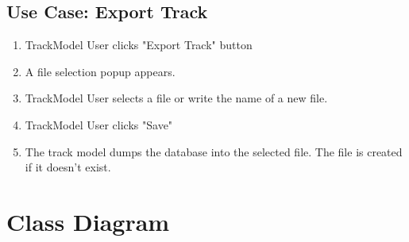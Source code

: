 \documentclass{scrreprt}
\begin{document}
\subsection{Use Case: Export Track}
\begin{enumerate}
	\item TrackModel User clicks "Export Track" button
	\item A file selection popup appears.
	\item TrackModel User selects a file or write the name of a new file.
	\item TrackModel User clicks "Save"
	\item The track model dumps the database into the selected file. The file is created if it doesn't exist.
\end{enumerate}


\section{Class Diagram}
\end{document}
